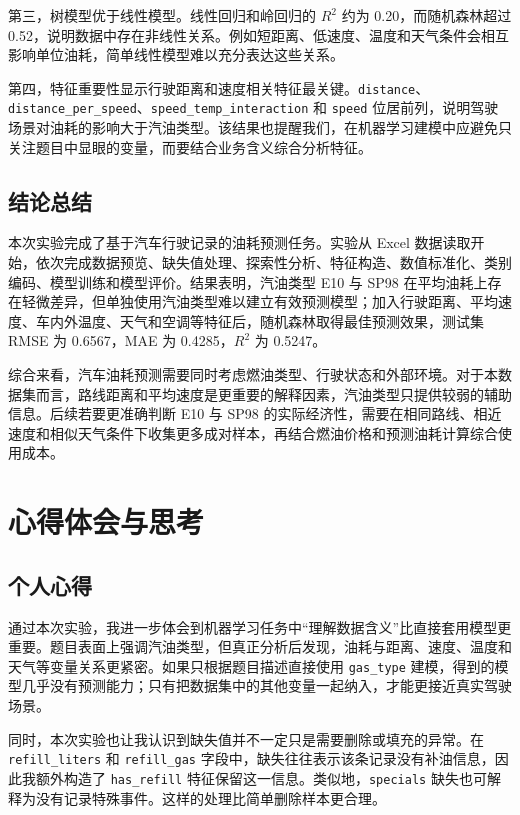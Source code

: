 \documentclass[UTF8,a4paper,12pt]{ctexart}
\begin{document}
第三，树模型优于线性模型。线性回归和岭回归的 $R^2$ 约为 0.20，而随机森林超过 0.52，说明数据中存在非线性关系。例如短距离、低速度、温度和天气条件会相互影响单位油耗，简单线性模型难以充分表达这些关系。

第四，特征重要性显示行驶距离和速度相关特征最关键。\texttt{distance}、\texttt{distance\_per\_speed}、\texttt{speed\_temp\_interaction} 和 \texttt{speed} 位居前列，说明驾驶场景对油耗的影响大于汽油类型。该结果也提醒我们，在机器学习建模中应避免只关注题目中显眼的变量，而要结合业务含义综合分析特征。

\subsection{结论总结}

本次实验完成了基于汽车行驶记录的油耗预测任务。实验从 Excel 数据读取开始，依次完成数据预览、缺失值处理、探索性分析、特征构造、数值标准化、类别编码、模型训练和模型评价。结果表明，汽油类型 E10 与 SP98 在平均油耗上存在轻微差异，但单独使用汽油类型难以建立有效预测模型；加入行驶距离、平均速度、车内外温度、天气和空调等特征后，随机森林取得最佳预测效果，测试集 RMSE 为 0.6567，MAE 为 0.4285，$R^2$ 为 0.5247。

综合来看，汽车油耗预测需要同时考虑燃油类型、行驶状态和外部环境。对于本数据集而言，路线距离和平均速度是更重要的解释因素，汽油类型只提供较弱的辅助信息。后续若要更准确判断 E10 与 SP98 的实际经济性，需要在相同路线、相近速度和相似天气条件下收集更多成对样本，再结合燃油价格和预测油耗计算综合使用成本。

\section{心得体会与思考}

\subsection{个人心得}

通过本次实验，我进一步体会到机器学习任务中“理解数据含义”比直接套用模型更重要。题目表面上强调汽油类型，但真正分析后发现，油耗与距离、速度、温度和天气等变量关系更紧密。如果只根据题目描述直接使用 \texttt{gas\_type} 建模，得到的模型几乎没有预测能力；只有把数据集中的其他变量一起纳入，才能更接近真实驾驶场景。

同时，本次实验也让我认识到缺失值并不一定只是需要删除或填充的异常。在 \texttt{refill\_liters} 和 \texttt{refill\_gas} 字段中，缺失往往表示该条记录没有补油信息，因此我额外构造了 \texttt{has\_refill} 特征保留这一信息。类似地，\texttt{specials} 缺失也可解释为没有记录特殊事件。这样的处理比简单删除样本更合理。
\end{document}
